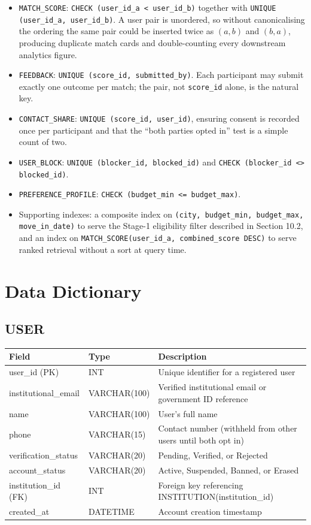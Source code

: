 \documentclass[12pt,a4paper]{report}
\begin{document}
\begin{itemize}[noitemsep]
    \item \texttt{MATCH\_SCORE}: \texttt{CHECK (user\_id\_a < user\_id\_b)} together with \texttt{UNIQUE (user\_id\_a, user\_id\_b)}. A user pair is unordered, so without canonicalising the ordering the same pair could be inserted twice as $(a,b)$ and $(b,a)$, producing duplicate match cards and double-counting every downstream analytics figure.
    \item \texttt{FEEDBACK}: \texttt{UNIQUE (score\_id, submitted\_by)}. Each participant may submit exactly one outcome per match; the pair, not \texttt{score\_id} alone, is the natural key.
    \item \texttt{CONTACT\_SHARE}: \texttt{UNIQUE (score\_id, user\_id)}, ensuring consent is recorded once per participant and that the ``both parties opted in'' test is a simple count of two.
    \item \texttt{USER\_BLOCK}: \texttt{UNIQUE (blocker\_id, blocked\_id)} and \texttt{CHECK (blocker\_id <> blocked\_id)}.
    \item \texttt{PREFERENCE\_PROFILE}: \texttt{CHECK (budget\_min <= budget\_max)}.
    \item Supporting indexes: a composite index on \texttt{(city, budget\_min, budget\_max, move\_in\_date)} to serve the Stage-1 eligibility filter described in Section 10.2, and an index on \texttt{MATCH\_SCORE(user\_id\_a, combined\_score DESC)} to serve ranked retrieval without a sort at query time.
\end{itemize}

\section{Data Dictionary}

\subsection*{USER}
\begin{longtable}{L{3.2cm}L{2.5cm}L{8.5cm}}
\toprule
\textbf{Field} & \textbf{Type} & \textbf{Description} \\
\midrule
\endhead
user\_id (PK) & INT &  Unique identifier for a registered user \\
institutional\_email & VARCHAR(100) &  Verified institutional email or government ID reference \\
name & VARCHAR(100) &  User's full name \\
phone & VARCHAR(15) &  Contact number (withheld from other users until both opt in) \\
verification\_status & VARCHAR(20) &  Pending, Verified, or Rejected \\
account\_status & VARCHAR(20) &  Active, Suspended, Banned, or Erased \\
institution\_id (FK) & INT &  Foreign key referencing INSTITUTION(institution\_id) \\
created\_at & DATETIME &  Account creation timestamp \\
\bottomrule
\end{longtable}
\end{document}

